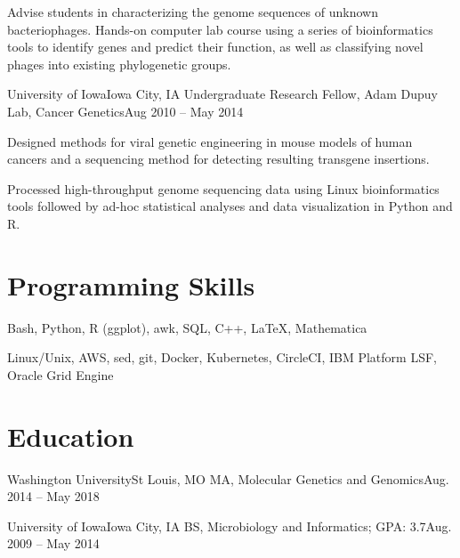             {Advise students in characterizing the genome sequences of unknown bacteriophages. Hands-on computer lab course using a series of bioinformatics tools to identify genes and predict their function, as well as classifying novel phages into existing phylogenetic groups.}

        \resumeItemListEnd

        \resumeSubheading
        {University of Iowa}{Iowa City, IA}
        {Undergraduate Research Fellow, Adam Dupuy Lab, Cancer Genetics}{Aug 2010 -- May 2014}

        \resumeItemListStart

            {Designed methods for viral genetic engineering in mouse models of human cancers and a sequencing method for detecting resulting transgene insertions.}
            
            {Processed high-throughput genome sequencing data using Linux bioinformatics tools followed by ad-hoc statistical analyses and data visualization in Python and R.}

        \resumeItemListEnd

    \resumeSubHeadingListEnd
    
\section{Programming Skills}
    \resumeSubHeadingListStart

        {Bash, Python, R (ggplot), awk, SQL, C++, \LaTeX, Mathematica}
          
        {Linux/Unix, AWS, sed, git, Docker, Kubernetes, CircleCI, IBM Platform LSF, Oracle Grid Engine}
          
    \resumeSubHeadingListEnd

\section{Education}
   \resumeSubHeadingListStart
   
      \resumeSubheading
      {Washington University}{St Louis, MO}
      {MA, Molecular Genetics and Genomics}{Aug. 2014 -- May 2018}
      
      \resumeSubheading
      {University of Iowa}{Iowa City, IA}
      {BS, Microbiology and Informatics;  GPA: 3.7}{Aug. 2009 -- May 2014}
      
